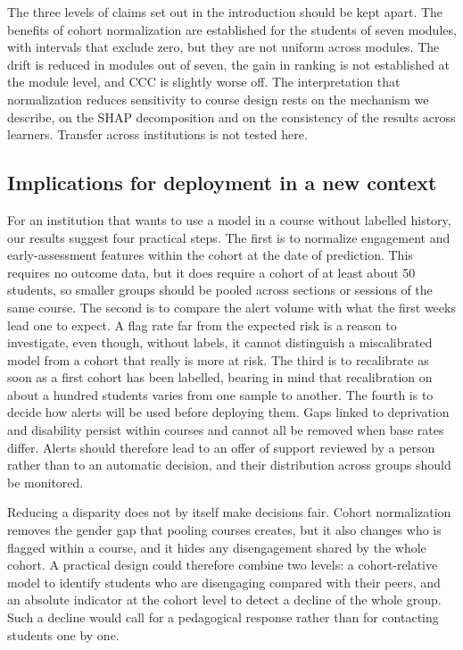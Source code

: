 \documentclass[journal]{IEEEtran}
\begin{document}
The three levels of claims set out in the introduction should be kept apart. The benefits of cohort normalization are established for the students of seven modules, with intervals that exclude zero, but they are not uniform across modules. The drift is reduced in \resNImprovedDrift{} modules out of seven, the gain in ranking is not established at the module level, and CCC is slightly worse off. The interpretation that normalization reduces sensitivity to course design rests on the mechanism we describe, on the SHAP decomposition and on the consistency of the results across learners. Transfer across institutions is not tested here.

\subsection{Implications for deployment in a new context}
For an institution that wants to use a model in a course without labelled history, our results suggest four practical steps. The first is to normalize engagement and early-assessment features within the cohort at the date of prediction. This requires no outcome data, but it does require a cohort of at least about 50 students, so smaller groups should be pooled across sections or sessions of the same course. The second is to compare the alert volume with what the first weeks lead one to expect. A flag rate far from the expected risk is a reason to investigate, even though, without labels, it cannot distinguish a miscalibrated model from a cohort that really is more at risk. The third is to recalibrate as soon as a first cohort has been labelled, bearing in mind that recalibration on about a hundred students varies from one sample to another. The fourth is to decide how alerts will be used before deploying them. Gaps linked to deprivation and disability persist within courses and cannot all be removed when base rates differ. Alerts should therefore lead to an offer of support reviewed by a person rather than to an automatic decision, and their distribution across groups should be monitored.

Reducing a disparity does not by itself make decisions fair. Cohort normalization removes the gender gap that pooling courses creates, but it also changes who is flagged within a course, and it hides any disengagement shared by the whole cohort. A practical design could therefore combine two levels: a cohort-relative model to identify students who are disengaging compared with their peers, and an absolute indicator at the cohort level to detect a decline of the whole group. Such a decline would call for a pedagogical response rather than for contacting students one by one.
\end{document}

